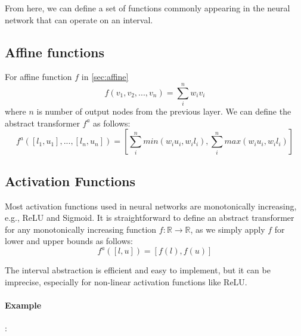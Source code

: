\documentclass[oneside,11pt,dvipsnames]{book}
\numberwithin{equation}{section}
\theoremstyle{definition}
\theoremstyle{remark}
\begin{document}
From here, we can define a set of functions commonly appearing in the neural network that can operate on an interval.

\subsection{Affine functions}

For affine function \(f\) in \ref{sec:affine}
\[f(v_1, v_2, ...,v_n) = \sum_{i}^{n}w_iv_i\]
where $n$ is number of output nodes from the previous layer. We can define the abstract transformer \(f^a\) as follows:
\[f^{a}([l_1, u_1],...,[l_n, u_n]) = [\sum_{i}^{n}min(w_iu_i, w_il_i), \sum_{i}^{n}max(w_iu_i, w_il_i)]\]




\subsection{Activation Functions}

Most activation functions used in neural networks are monotonically increasing, e.g., ReLU and Sigmoid. It is straightforward to define
an abstract transformer for any monotonically increasing function \(f : \mathbb{R} \to \mathbb{R}\), as we simply apply \(f\) for lower and upper bounds as follows:
\[f^a
([l, u]) = [ f(l), f(u)]
\]

The interval abstraction is efficient and easy to implement, but it can be imprecise, especially for non-linear activation functions like ReLU. 

\paragraph{Example}: 
\end{document}
